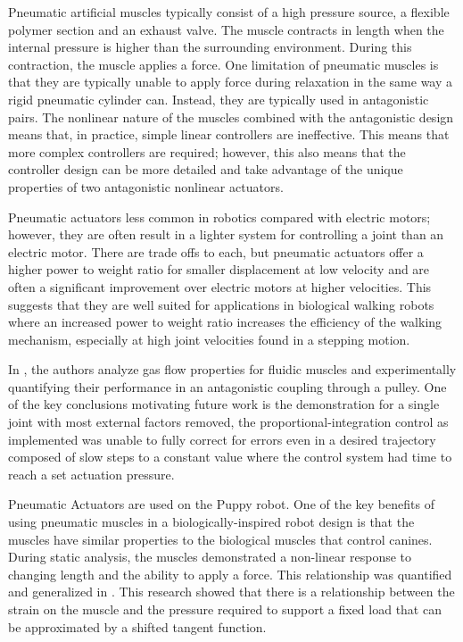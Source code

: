 
Pneumatic artificial muscles typically consist of a high pressure source, a
flexible polymer section and an exhaust valve. The muscle contracts in length
when the internal pressure is higher than the surrounding environment. During
this contraction, the muscle applies a force. One limitation of pneumatic
muscles is that they are typically unable to apply force during relaxation in
the same way a rigid pneumatic cylinder can. Instead, they are typically used in
antagonistic pairs. The nonlinear nature of the muscles combined with the
antagonistic design means that, in practice, simple linear controllers are
ineffective. This means that more complex controllers are required; however,
this also means that the controller design can be more detailed and take
advantage of the unique properties of two antagonistic nonlinear actuators.

Pneumatic actuators less common in robotics compared with electric motors;
however,
they are often result in a lighter system for controlling a joint than an
electric motor. There are trade offs to each, but pneumatic actuators offer a
higher power to weight ratio for smaller displacement at low velocity and are
often a significant improvement over electric motors at higher velocities.
\cite{Tavakoli2008} This suggests that they are well suited for applications in
biological walking robots where an increased power to weight ratio increases
the efficiency of the walking mechanism, especially at high joint velocities
found in a stepping motion.


In \cite{Situm2008}, the authors analyze gas flow properties for fluidic muscles
and experimentally quantifying their performance in an antagonistic coupling
through a pulley. One of the key conclusions motivating future work is the
demonstration for a single joint with most external factors removed, the
proportional-integration control as implemented was unable to fully correct for
errors even in a desired trajectory composed of slow steps to a constant value
where the control system had time to reach a set actuation pressure.

Pneumatic Actuators are used on the Puppy robot. One of the key
benefits of using pneumatic muscles in a biologically-inspired robot design is
that the muscles have similar properties to the biological muscles that control
canines. \cite{Tavakoli2008}
During static analysis, the muscles demonstrated a non-linear response to
changing length and the ability to apply a force. This relationship was
quantified and generalized in \cite{HuntPMuscles}. This research showed that
there is a relationship between the strain on the muscle and the pressure
required to support a fixed load that can be approximated by a shifted tangent
function. 

